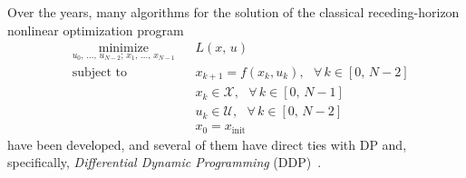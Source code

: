 Over the years, many algorithms for the solution of the classical receding-horizon nonlinear optimization program
\begin{equation}\label{eq:opt_prog}
	\begin{aligned}
		& \underset{u_0,\,\ldots,\,u_{N-2};\,x_1,\,\ldots,\,x_{N-1}}{\text{minimize}}
		& & L(x,\,u) \\
		& \text{subject to}
		& & x_{k+1} = f(x_k, u_k),\,\,\,\,\forall\,k\in[0,\,N-2]\\
		& & & x_k \in \mathcal{X},\,\,\,\,\forall\,k\in[0,\,N-1] \\
		& & & u_k \in \mathcal{U},\,\,\,\,\forall\,k\in[0,\,N-2] \\
		& & & x_0 = x_{\text{init}}
	\end{aligned}
\end{equation}
have been developed, and several of them have direct ties with DP and, specifically, \textit{ Differential Dynamic Programming} (DDP)~\cite{rhc:jacobson1970differential,rhc:todorov2005generalized,rhc:diehl2009efficient,rhc:tassa2012synthesis}.